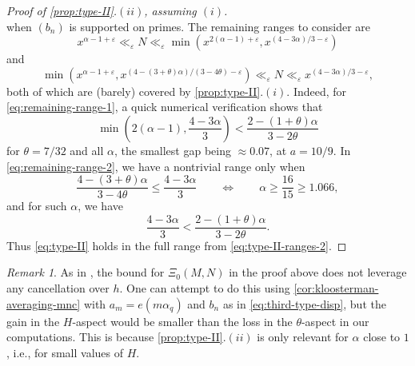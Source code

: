 \documentclass[reqno,11pt]{amsart}
\theoremstyle{remark}
\newtheorem*{remark}{Remark}
\numberwithin{equation}{section}
\newcommand{\eps}{\varepsilon}
\begin{document}
\begin{proof}[Proof of \cref{prop:type-II}.$(ii)$, assuming $(i)$]
\[\]
when $(b_n)$ is supported on primes. The remaining ranges to consider are
\begin{equation} \label{eq:remaining-range-1}
    x^{\alpha - 1 + \eps} \ll_\eps N \ll_\eps \min\left( x^{2(\alpha-1)+\eps}, x^{(4-3\alpha)/3 - \eps}\right)
\end{equation}
and
\begin{equation} \label{eq:remaining-range-2}
    \min \left( x^{\alpha-1+\eps}, x^{(4-(3+\theta)\alpha)/(3-4\theta)-\eps} \right)
    \ll_\eps N 
    \ll_\eps 
    x^{(4-3\alpha)/3 - \eps},
\end{equation}
both of which are (barely) covered by \cref{prop:type-II}.$(i)$. Indeed, for \cref{eq:remaining-range-1}, a quick numerical verification shows that 
\[
    \min\left(2(\alpha-1), \frac{4-3\alpha}{3}\right)
    <
    \frac{2-(1+\theta)\alpha}{3-2\theta}
\]
for $\theta = 7/32$ and all $\alpha$, the smallest gap being $\approx 0.07$, at $a = 10/9$. In \cref{eq:remaining-range-2}, we have a nontrivial range only when
\[
    \frac{4-(3+\theta)\alpha}{3-4\theta} \le \frac{4-3\alpha}{3}
    \qquad 
    \iff 
    \qquad 
    \alpha \ge \frac{16}{15} \ge 1.066,
\]
and for such $\alpha$, we have
\[
    \frac{4-3\alpha}{3} < \frac{2-(1+\theta)\alpha}{3-2\theta}.
\]
Thus \cref{eq:type-II} holds in the full range from \cref{eq:type-II-ranges-2}.
\end{proof}

\begin{remark}
As in \cite[\S 3.10]{merikoski2023largest}, the bound for $\Xi_0(M, N)$ in the proof above does not leverage any cancellation over $h$. One can attempt to do this using \cref{cor:kloosterman-averaging-mnc} with $a_m = e(m\alpha_q)$ and $b_n$ as in \cref{eq:third-type-disp}, but the gain in the $H$-aspect would be smaller than the loss in the $\theta$-aspect in our computations. This is because \cref{prop:type-II}.$(ii)$ is only relevant for $\alpha$ close to $1$, i.e., for small values of $H$.
\end{remark}
\end{document}
